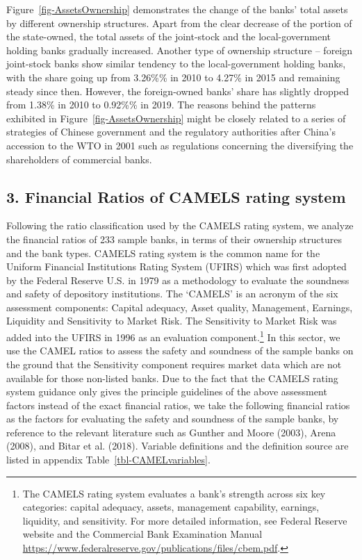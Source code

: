 \documentclass[
  12pt,
  a4paper,
]{scrreprt}
\begin{document}
{{{{Figure~\ref{fig-AssetsOwnership} demonstrates the change of the banks'
total assets by different ownership structures. Apart from the clear
decrease of the portion of the state-owned, the total assets of the
joint-stock and the local-government holding banks gradually increased.
Another type of ownership structure -- foreign joint-stock banks show
similar tendency to the local-government holding banks, with the share
going up from 3.26\%\% in 2010 to 4.27\% in 2015 and remaining steady
since then. However, the foreign-owned banks' share has slightly dropped
from 1.38\% in 2010 to 0.92\%\% in 2019. The reasons behind the patterns
exhibited in Figure~\ref{fig-AssetsOwnership} might be closely related
to a series of strategies of Chinese government and the regulatory
authorities after China's accession to the WTO in 2001 such as
regulations concerning the diversifying the shareholders of commercial
banks.

\subsection{3. Financial Ratios of CAMELS rating
system}\label{financial-ratios-of-camels-rating-system}

Following the ratio classification used by the CAMELS rating system, we
analyze the financial ratios of 233 sample banks, in terms of their
ownership structures and the bank types. CAMELS rating system is the
common name for the Uniform Financial Institutions Rating System (UFIRS)
which was first adopted by the Federal Reserve U.S. in 1979 as a
methodology to evaluate the soundness and safety of depository
institutions. The `CAMELS' is an acronym of the six assessment
components: Capital adequacy, Asset quality, Management, Earnings,
Liquidity and Sensitivity to Market Risk. The Sensitivity to Market Risk
was added into the UFIRS in 1996 as an evaluation component.\footnote{The
  CAMELS rating system evaluates a bank's strength across six key
  categories: capital adequacy, assets, management capability, earnings,
  liquidity, and sensitivity. For more detailed information, see Federal
  Reserve website and the Commercial Bank Examination Manual
  \url{https://www.federalreserve.gov/publications/files/cbem.pdf}.} In
this sector, we use the CAMEL ratios to assess the safety and soundness
of the sample banks on the ground that the Sensitivity component
requires market data which are not available for those non-listed banks.
Due to the fact that the CAMELS rating system guidance only gives the
principle guidelines of the above assessment factors instead of the
exact financial ratios, we take the following financial ratios as the
factors for evaluating the safety and soundness of the sample banks, by
reference to the relevant literature such as Gunther and Moore (2003),
Arena (2008), and Bitar et al. (2018). Variable definitions and the
definition source are listed in appendix Table~\ref{tbl-CAMELvariables}.

}}}}
\end{document}
